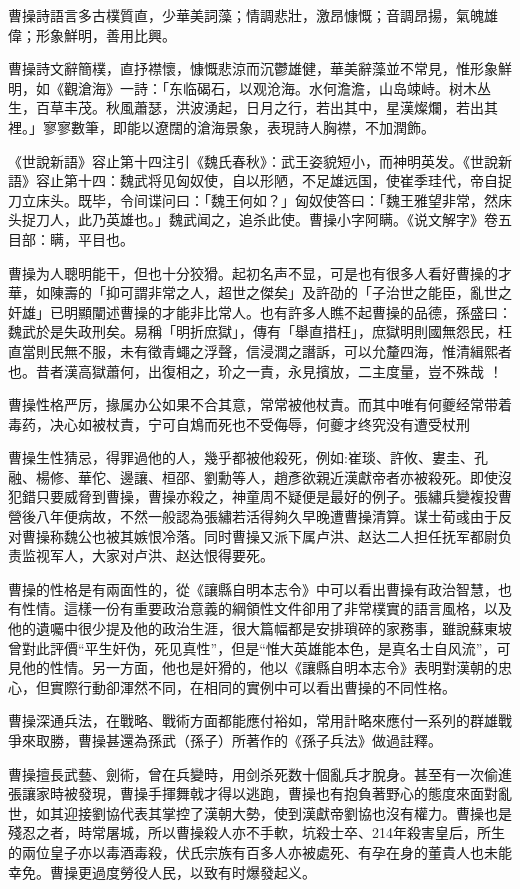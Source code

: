 曹操詩語言多古樸質直，少華美詞藻；情調悲壯，激昂慷慨；音調昂揚，氣魄雄偉；形象鮮明，善用比興。

曹操詩文辭簡樸，直抒襟懷，慷慨悲涼而沉鬱雄健，華美辭藻並不常見，惟形象鮮明，如《觀滄海》一詩：「东临碣石，以观沧海。水何澹澹，山岛竦峙。树木丛生，百草丰茂。秋風蕭瑟，洪波湧起，日月之行，若出其中，星漢燦爛，若出其裡。」寥寥數筆，即能以遼闊的滄海景象，表現詩人胸襟，不加潤飾。

《世說新語》容止第十四注引《魏氏春秋》：武王姿貌短小，而神明英发。《世說新語》容止第十四：魏武将见匈奴使，自以形陋，不足雄远国，使崔季珪代，帝自捉刀立床头。既毕，令间谍问曰：「魏王何如？」匈奴使答曰：「魏王雅望非常，然床头捉刀人，此乃英雄也。」魏武闻之，追杀此使。曹操小字阿瞒。《说文解字》卷五目部：瞒，平目也。

曹操为人聰明能干，但也十分狡猾。起初名声不显，可是也有很多人看好曹操的才華，如陳壽的「抑可謂非常之人，超世之傑矣」及許劭的「子治世之能臣，亂世之奸雄」已明顯闡述曹操的才能非比常人。也有許多人瞧不起曹操的品德，孫盛曰：魏武於是失政刑矣。易稱「明折庶獄」，傳有「舉直措枉」，庶獄明則國無怨民，枉直當則民無不服，未有徵青蠅之浮聲，信浸潤之譖訴，可以允釐四海，惟清緝熙者也。昔者漢高獄蕭何，出復相之，玠之一責，永見擯放，二主度量，豈不殊哉 ！

曹操性格严厉，掾属办公如果不合其意，常常被他杖責。而其中唯有何夔经常带着毒药，决心如被杖責，宁可自鴆而死也不受侮辱，何夔才终究没有遭受杖刑

曹操生性猜忌，得罪過他的人，幾乎都被他殺死，例如:崔琰、許攸、婁圭、孔融、楊修、華佗、邊讓、桓邵、劉勳等人，趙彥欲親近漢獻帝者亦被殺死。即使沒犯錯只要威脅到曹操，曹操亦殺之，神童周不疑便是最好的例子。張繡兵變複投曹營後八年便病故，不然一般認為張繡若活得夠久早晚遭曹操清算。谋士荀彧由于反对曹操称魏公也被其嫉恨冷落。同时曹操又派下属卢洪、赵达二人担任抚军都尉负责监视军人，大家对卢洪、赵达恨得要死。

曹操的性格是有兩面性的，從《讓縣自明本志令》中可以看出曹操有政治智慧，也有性情。這樣一份有重要政治意義的綱領性文件卻用了非常樸實的語言風格，以及他的遺囑中很少提及他的政治生涯，很大篇幅都是安排瑣碎的家務事，雖說蘇東坡曾對此評價“平生奸伪，死见真性”，但是“惟大英雄能本色，是真名士自风流”，可見他的性情。另一方面，他也是奸猾的，他以《讓縣自明本志令》表明對漢朝的忠心，但實際行動卻渾然不同，在相同的實例中可以看出曹操的不同性格。

曹操深通兵法，在戰略、戰術方面都能應付裕如，常用計略來應付一系列的群雄戰爭來取勝，曹操甚還為孫武（孫子）所著作的《孫子兵法》做過註釋。

曹操擅長武藝、劍術，曾在兵變時，用剑杀死数十個亂兵才脫身。甚至有一次偷進張讓家時被發現，曹操手揮舞戟才得以逃跑，曹操也有抱負著野心的態度來面對亂世，如其迎接劉協代表其掌控了漢朝大勢，使到漢獻帝劉協也沒有權力。曹操也是殘忍之者，時常屠城，所以曹操殺人亦不手軟，坑殺士卒、214年殺害皇后，所生的兩位皇子亦以毒酒毒殺，伏氏宗族有百多人亦被處死、有孕在身的董貴人也未能幸免。曹操更過度勞役人民，以致有时爆發起义。

